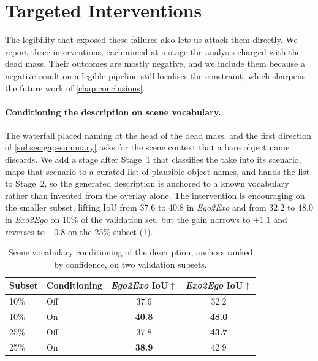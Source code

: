 \section{Targeted Interventions}
\label{sec:interventions}

The legibility that exposed these failures also lets us attack them directly. We report three interventions, each aimed at a stage the analysis charged with the dead mass. Their outcomes are mostly negative, and we include them because a negative result on a legible pipeline still localises the constraint, which sharpens the future work of \cref{chap:conclusions}.

\paragraph{Conditioning the description on scene vocabulary.}
The waterfall placed naming at the head of the dead mass, and the first direction of \cref{subsec:gap-summary} asks for the scene context that a bare object name discards. We add a stage after Stage~1 that classifies the take into its scenario, maps that scenario to a curated list of plausible object names, and hands the list to Stage~2, so the generated description is anchored to a known vocabulary rather than invented from the overlay alone. The intervention is encouraging on the smaller subset, lifting IoU from 37.6 to 40.8 in \textit{Ego2Exo} and from 32.2 to 48.0 in \textit{Exo2Ego} on 10\% of the validation set, but the gain narrows to $+1.1$ and reverses to $-0.8$ on the 25\% subset (\cref{tab:abl-vlm-align}). 

\begin{table}
  \centering\small
  \setlength{\tabcolsep}{6pt}
  \caption{Scene vocabulary conditioning of the description, anchors ranked by confidence, on two validation subsets.}
  \label{tab:abl-vlm-align}
  \begin{tabular}{llcc}
  \toprule
  Subset & Conditioning & \textit{Ego2Exo} IoU$\uparrow$ & \textit{Exo2Ego} IoU$\uparrow$ \\
  \midrule
  10\% & Off & 37.6 & 32.2 \\
  10\% & On  & \textbf{40.8} & \textbf{48.0} \\
  \midrule
  25\% & Off & 37.8 & \textbf{43.7} \\
  25\% & On  & \textbf{38.9} & 42.9 \\
  \bottomrule
  \end{tabular}
\end{table}

